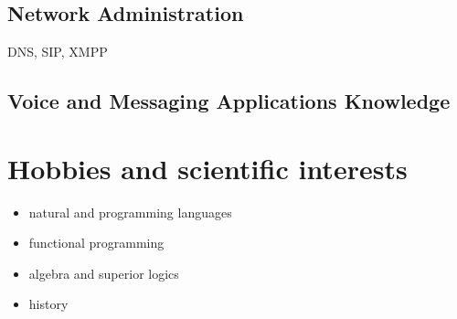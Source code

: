 	\subsection{Network Administration}	
              {}{}{}{}
                   {}{}{}{}
                            {}{}{}{}
         {DNS, SIP, XMPP}{}{}{}{} %

    \subsection{Voice and Messaging Applications Knowledge}        

			
	
\section{Hobbies and scientific interests}

	\begin{itemize}
		\item natural and programming languages
		\item functional programming
		\item algebra and superior logics
		\item history
	\end{itemize}
          
